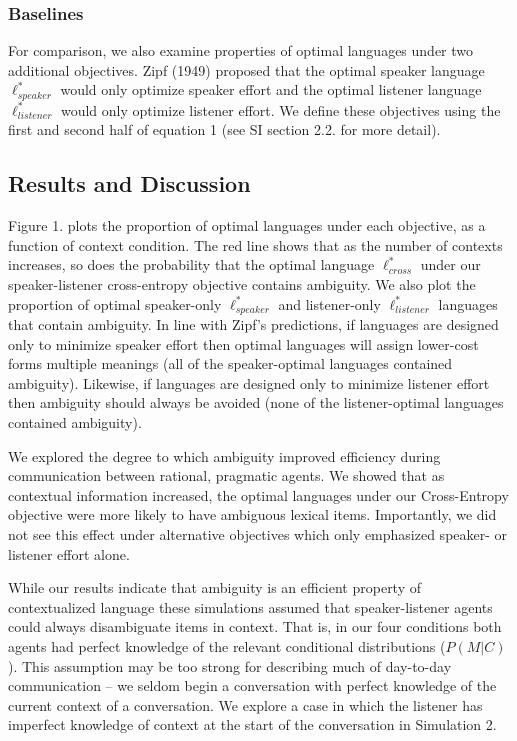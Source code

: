 \documentclass[10pt, letterpaper]{article}
\begin{document}
\subsubsection{Baselines}\label{baselines}

For comparison, we also examine properties of optimal languages under
two additional objectives. Zipf (1949) proposed that the optimal speaker
language \(\ell_{speaker}^*\) would only optimize speaker effort and the
optimal listener language \(\ell_{listener}^*\) would only optimize
listener effort. We define these objectives using the first and second
half of equation 1 (see SI section 2.2. for more detail).\par

\subsection{Results and Discussion}\label{results-and-discussion}

Figure 1. plots the proportion of optimal languages under each
objective, as a function of context condition. The red line shows that
as the number of contexts increases, so does the probability that the
optimal language \(\ell^*_{cross}\) under our speaker-listener
cross-entropy objective contains ambiguity. We also plot the proportion
of optimal speaker-only \(\ell^*_{speaker}\) and listener-only
\(\ell^*_{listener}\) languages that contain ambiguity. In line with
Zipf's predictions, if languages are designed only to minimize speaker
effort then optimal languages will assign lower-cost forms multiple
meanings (all of the speaker-optimal languages contained ambiguity).
Likewise, if languages are designed only to minimize listener effort
then ambiguity should always be avoided (none of the listener-optimal
languages contained ambiguity).\par

We explored the degree to which ambiguity improved efficiency during
communication between rational, pragmatic agents. We showed that as
contextual information increased, the optimal languages under our
Cross-Entropy objective were more likely to have ambiguous lexical
items. Importantly, we did not see this effect under alternative
objectives which only emphasized speaker- or listener effort alone.\par

While our results indicate that ambiguity is an efficient property of
contextualized language these simulations assumed that speaker-listener
agents could always disambiguate items in context. That is, in our four
conditions both agents had perfect knowledge of the relevant conditional
distributions (\(P(M|C)\)). This assumption may be too strong for
describing much of day-to-day communication -- we seldom begin a
conversation with perfect knowledge of the current context of a
conversation. We explore a case in which the listener has imperfect
knowledge of context at the start of the conversation in Simulation
2.\par
\end{document}
